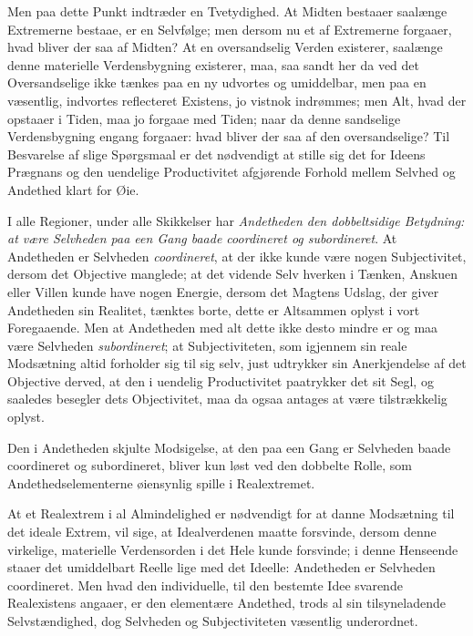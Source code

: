 \documentclass[12pt]{book}
\newcommand{\opage}[1]{\marginnote{\footnotesize\textit{[#1]}}}
\begin{document}
Men paa dette Punkt indtræder en Tvetydighed. At Midten bestaaer saalænge Extremerne bestaae, er en Selvfølge; men dersom nu et af Extremerne forgaaer, hvad bliver der saa af Midten? At en oversandselig Verden existerer, saalænge denne materielle Verdensbygning existerer, maa, saa%
\opage{464}sandt her da ved det Oversandselige ikke tænkes paa en ny udvortes og umiddelbar, men paa en væsentlig, indvortes reflecteret Existens, jo vistnok indrømmes; men Alt, hvad der opstaaer i Tiden, maa jo forgaae med Tiden; naar da denne sandselige Verdensbygning engang forgaaer: hvad bliver der saa af den oversandselige? Til Besvarelse af slige Spørgsmaal er det nødvendigt at stille sig det for Ideens Prægnans og den uendelige Productivitet afgjørende Forhold mellem Selvhed og Andethed klart for Øie.

I alle Regioner, under alle Skikkelser har \emph{Andetheden den dobbeltsidige Betydning: at være Selvheden paa een Gang baade coordineret og subordineret}. At Andetheden er Selvheden \emph{coordineret}, at der ikke kunde være nogen Subjectivitet, dersom det Objective manglede; at det vidende Selv hverken i Tænken, Anskuen eller Villen kunde have nogen Energie, dersom det Magtens Udslag, der giver Andetheden sin Realitet, tænktes borte, dette er Altsammen oplyst i vort Foregaaende. Men at Andetheden med alt dette ikke desto mindre er og maa være Selvheden \emph{subordineret}; at Subjectiviteten, som igjennem sin reale Modsætning altid forholder sig til sig selv, just udtrykker sin Anerkjendelse af det Objective derved, at den i uendelig Productivitet paatrykker det sit Segl, og saaledes besegler dets Objectivitet, maa da ogsaa antages at være tilstrækkelig oplyst.

Den i Andetheden skjulte Modsigelse, at den paa een Gang er Selvheden baade coordineret og subordineret, bliver kun løst ved den dobbelte Rolle, som Andethedselementerne øiensynlig spille i Realextremet.

At et Realextrem i al Almindelighed er nødvendigt for at danne Modsætning til det ideale Extrem, vil sige, at Idealverdenen maatte forsvinde, dersom denne virkelige, materielle Verdensorden i det Hele kunde forsvinde; i denne
\opage{465}Henseende staaer det umiddelbart Reelle lige med det Ideelle: Andetheden er Selvheden coordineret. Men hvad den individuelle, til den bestemte Idee svarende Realexistens angaaer, er den elementære Andethed, trods al sin tilsyneladende Selvstændighed, dog Selvheden og Subjectiviteten væsentlig underordnet.
\end{document}
